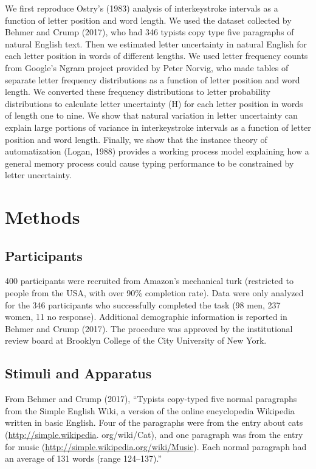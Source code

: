 \documentclass[,man,donotrepeattitle,floatsintext]{apa6}
\begin{document}
We first reproduce Ostry's (1983) analysis of interkeystroke intervals as a function of letter position and word length. We used the dataset collected by Behmer and Crump (2017), who had 346 typists copy type five paragraphs of natural English text. Then we estimated letter uncertainty in natural English for each letter position in words of different lengths. We used letter frequency counts from Google's Ngram project provided by Peter Norvig, who made tables of separate letter frequency distributions as a function of letter position and word length. We converted these frequency distributions to letter probability distributions to calculate letter uncertainty (H) for each letter position in words of length one to nine. We show that natural variation in letter uncertainty can explain large portions of variance in interkeystroke intervals as a function of letter position and word length. Finally, we show that the instance theory of automatization (Logan, 1988) provides a working process model explaining how a general memory process could cause typing performance to be constrained by letter uncertainty.

\hypertarget{methods}{%
\section{Methods}\label{methods}}

\hypertarget{participants}{%
\subsection{Participants}\label{participants}}

400 participants were recruited from Amazon's mechanical turk (restricted to people from the USA, with over 90\% completion rate). Data were only analyzed for the 346 participants who successfully completed the task (98 men, 237 women, 11 no response). Additional demographic information is reported in Behmer and Crump (2017). The procedure was approved by the institutional review board at Brooklyn College of the City University of New York.

\hypertarget{stimuli-and-apparatus}{%
\subsection{Stimuli and Apparatus}\label{stimuli-and-apparatus}}

From Behmer and Crump (2017), \enquote{Typists copy-typed five normal paragraphs from the Simple English Wiki, a version of the online encyclopedia Wikipedia written in basic English. Four of the paragraphs were from the entry about cats (\url{http://simple.wikipedia}. org/wiki/Cat), and one paragraph was from the entry for music (\url{http://simple.wikipedia.org/wiki/Music}). Each normal paragraph had an average of 131 words (range 124--137).}
\end{document}
